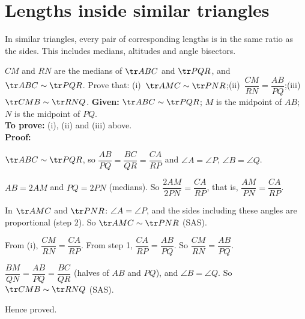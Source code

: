 \section{Lengths inside similar triangles}

In similar triangles, every pair of corresponding lengths is in the same ratio as the sides. This includes medians, altitudes and angle bisectors.

\begin{example}
$CM$ and $RN$ are the medians of $\tr ABC$ and $\tr PQR$, and $\tr ABC\sim\tr PQR$. Prove that:
(i)~$\tr AMC\sim\tr PNR$;\quad (ii)~$\dfrac{CM}{RN}=\dfrac{AB}{PQ}$;\quad (iii)~$\tr CMB\sim\tr RNQ$.
\textbf{Given:} $\tr ABC\sim\tr PQR$; $M$ is the midpoint of $AB$; $N$ is the midpoint of $PQ$.\\
\textbf{To prove:} (i), (ii) and (iii) above.\\
\textbf{Proof:}
\begin{steps}
  \item $\tr ABC\sim\tr PQR$, so $\dfrac{AB}{PQ}=\dfrac{BC}{QR}=\dfrac{CA}{RP}$ and $\angle A=\angle P$, $\angle B=\angle Q$.
  \item $AB=2AM$ and $PQ=2PN$ (medians). So $\dfrac{2AM}{2PN}=\dfrac{CA}{RP}$, that is, $\dfrac{AM}{PN}=\dfrac{CA}{RP}$.
  \item[(i)] In $\tr AMC$ and $\tr PNR$: $\angle A=\angle P$, and the sides including these angles are proportional (step 2). So $\tr AMC\sim\tr PNR$ (SAS).
  \item[(ii)] From (i), $\dfrac{CM}{RN}=\dfrac{CA}{RP}$. From step 1, $\dfrac{CA}{RP}=\dfrac{AB}{PQ}$. So $\dfrac{CM}{RN}=\dfrac{AB}{PQ}$.
  \item[(iii)] $\dfrac{BM}{QN}=\dfrac{AB}{PQ}=\dfrac{BC}{QR}$ (halves of $AB$ and $PQ$), and $\angle B=\angle Q$. So $\tr CMB\sim\tr RNQ$ (SAS).
\end{steps}
Hence proved.
\end{example}

